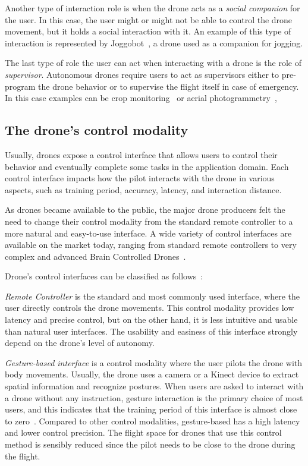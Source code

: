 Another type of interaction role is when the drone acts as a \textit{social companion} for the user. 
In this case, the user might or might not be able to control the drone movement, but it holds a social interaction with it.
An example of this type of interaction is represented by Joggobot~\cite{graether2012joggobot}, a drone used as a companion for jogging.

The last type of role the user can act when interacting with a drone is the role of \textit{supervisor}.
Autonomous drones require users to act as supervisors either to pre-program the drone behavior or to 
supervise the flight itself in case of emergency. In this case examples can be crop monitoring~\cite{dantu2011karma} or aerial photogrammetry~\cite{nex2014uav3Dmapping}, 

\subsection{The drone's control modality}\label{subsec:hdi_drone_control_mod}
Usually, drones expose a control interface that allows users to control their behavior and eventually complete some tasks in the application domain.
Each control interface impacts how the pilot interacts with the drone in various aspects, 
such as training period, accuracy, latency, and interaction distance.

As drones became available to the public, the major drone producers felt the need to change their control modality 
from the standard remote controller to a more natural and easy-to-use interface.
A wide variety of control interfaces are available on the market today, 
ranging from standard remote controllers to very complex and advanced Brain Controlled Drones~\cite{lafleur2013quadcopterBCI}.

Drone's control interfaces can be classified as follows~\cite{tezza2019hdi}:

\textit{Remote Controller} is the standard and most commonly used interface, where the user directly controls the drone movements.
This control modality provides low latency and precise control, but on the other hand, it is less intuitive and usable 
than natural user interfaces. The usability and easiness of this interface strongly depend on the drone's level of autonomy.

\textit{Gesture-based interface} is a control modality where the user pilots the drone with body movements.
Usually, the drone uses a camera or a Kinect device to extract spatial information and recognize postures. 
When users are asked to interact with a drone without any instruction, gesture interaction is the primary choice of most users, 
and this indicates that the training period of this interface is almost close to zero~\cite{cauchard2015droneAndMe}. 
Compared to other control modalities, gesture-based has a high latency and lower control precision. 
The flight space for drones that use this control method is sensibly reduced since the pilot needs to be close to the drone during the flight.

